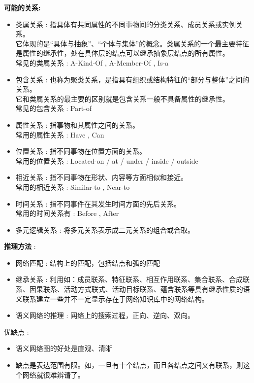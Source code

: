 \documentclass[UTF8,a4paper]{ctexart}
\begin{document}
\textbf{可能的关系:}
\begin{itemize}
	\item 类属关系 : 指具体有共同属性的不同事物间的分类关系、成员关系或实例关系。\\
	      它体现的是“具体与抽象”、“个体与集体”的概念。类属关系的一个最主要特征是属性的继承性，处在具体层的结点可以继承抽象层结点的所有属性。\\
	      常见的类属关系 : A-Kind-Of , A-Member-Of , Is-a
	\item 包含关系 : 也称为聚类关系，是指具有组织或结构特征的“部分与整体”之间的关系。\\
	      它和类属关系的最主要的区别就是包含关系一般不具备属性的继承性。\\
	      常见的包含关系 : Part-of
	\item 属性关系 : 指事物和其属性之间的关系。\\
	      常用的属性关系 : Have , Can
	\item 位置关系 : 指不同事物在位置方面的关系。\\
	      常用的位置关系 : Located-on / at / under / inside / outside
	\item 相近关系 : 指不同事物在形状、内容等方面相似和接近。\\
	      常用的相近关系 : Similar-to , Near-to
	\item 时间关系 : 指不同事件在其发生时间方面的先后关系。\\
	      常用的时间关系有 : Before , After
	\item 多元逻辑关系 : 将多元关系表示成二元关系的组合或合取。
\end{itemize}

\textbf{推理方法} :
\begin{itemize}
	\item 网络匹配 : 结构上的匹配，包括结点和弧的匹配
	\item 继承关系 : 利用如：成员联系、特征联系、相互作用联系、集合联系、合成联系、因果联系、活动方式联式、活动目标联系、蕴含联系等具有继承性质的语义联系建立一些并不一定显示存在于网络知识库中的网络结构。
	\item 语义网络的推理 : 网络上的搜索过程，正向、逆向、双向。
\end{itemize}

优缺点 :
\begin{itemize}
	\item 语义网络图的好处是直观、清晰
	\item 缺点是表达范围有限。如，一旦有十个结点，而且各结点之间又有联系，则这个网络就很难辨请了。
\end{itemize}
\end{document}
